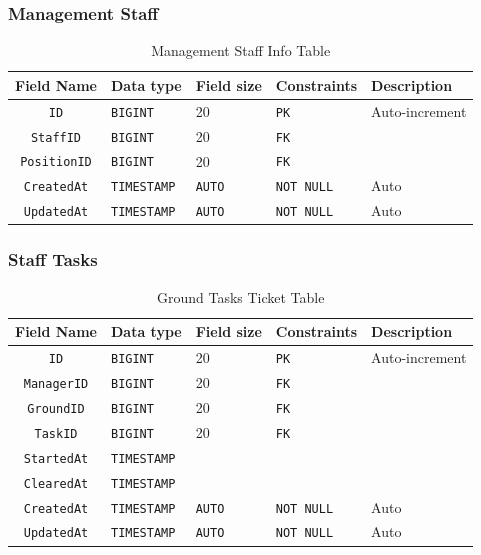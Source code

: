 \subsubsection{Management Staff}

\begin{table}[H]
	\centering
	\begin{tabular}{cllll}
		\hline
		Field Name & Data type & Field size & Constraints & Description \\ \hline
		\texttt{ID} & \texttt{BIGINT} & 20 & \texttt{PK} & Auto-increment \\
		\texttt{StaffID} & \texttt{BIGINT} & 20 & \texttt{FK} &  \\
		\texttt{PositionID} & \texttt{BIGINT} & 20 & \texttt{FK} &  \\
		
		\texttt{CreatedAt} & \texttt{TIMESTAMP} & \texttt{AUTO} & \texttt{NOT NULL} & Auto \\
		\texttt{UpdatedAt} & \texttt{TIMESTAMP} & \texttt{AUTO} & \texttt{NOT NULL} & Auto \\
		\hline
	\end{tabular}
	\caption{Management Staff Info Table}
\end{table}

\subsubsection{Staff Tasks}

\begin{table}[H]
	\centering
	\begin{tabular}{cllll}
		\hline
		Field Name & Data type & Field size & Constraints & Description \\ \hline
		\texttt{ID} & \texttt{BIGINT} & 20 & \texttt{PK} & Auto-increment \\
		\texttt{ManagerID} & \texttt{BIGINT} & 20 & \texttt{FK} &  \\
		\texttt{GroundID} & \texttt{BIGINT} & 20 & \texttt{FK} &  \\
		\texttt{TaskID} & \texttt{BIGINT} & 20 & \texttt{FK} &  \\
		\texttt{StartedAt} & \texttt{TIMESTAMP} & & &  \\
		\texttt{ClearedAt} & \texttt{TIMESTAMP} & & &  \\

		\texttt{CreatedAt} & \texttt{TIMESTAMP} & \texttt{AUTO} & \texttt{NOT NULL} & Auto \\
		\texttt{UpdatedAt} & \texttt{TIMESTAMP} & \texttt{AUTO} & \texttt{NOT NULL} & Auto \\
		\hline
	\end{tabular}
	\caption{Ground Tasks Ticket Table}
\end{table}

